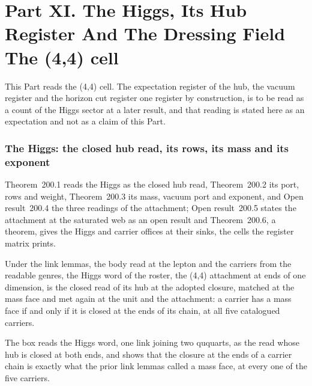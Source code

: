 \clearpage
\part*{Part XI. The Higgs, Its Hub Register And The Dressing Field\\[5pt]{\large The (4,4) cell}}
\label{atlaspart:11-cell-4-4-higgs}
This Part reads the (4,4) cell. The expectation register of the hub, the vacuum register and the horizon cut register one register by construction, is to be read as a count of the Higgs sector at a later result, and that reading is stated here as an expectation and not as a claim of this Part.
\section{The Higgs: the closed hub read, its rows, its mass and its exponent}\label{mod:VI-10-higgs-the-closed-hub-read-its-rows-its-mass-and-its-exponent}
\label{narr:open:6-10}Theorem~200.1 reads the Higgs as the closed hub read, Theorem~200.2 its port, rows and weight, Theorem~200.3 its mass, vacuum port and exponent, and Open result~200.4 the three readings of the attachment; Open result~200.5 states the attachment at the saturated web as an open result and Theorem~200.6, a theorem, gives the Higgs and carrier offices at their sinks, the cells the register matrix prints.
\begin{chconditional}\label{box:VI-10-higgs-the-closed-hub-read-its-rows-its-mass-and-its-exponent:1}
Under the link lemmas, the body read at the lepton and the carriers from the readable genres, the Higgs word of the roster, the (4,4) attachment at ends of one dimension, is the closed read of its hub at the adopted closure, matched at the mass face and met again at the unit and the attachment: a carrier has a mass face if and only if it is closed at the ends of its chain, at all five catalogued carriers.
\end{chconditional}
The box reads the Higgs word, one link joining two ququarts, as the read whose hub is closed at both ends, and shows that the closure at the ends of a carrier chain is exactly what the prior link lemmas called a mass face, at every one of the five carriers.
